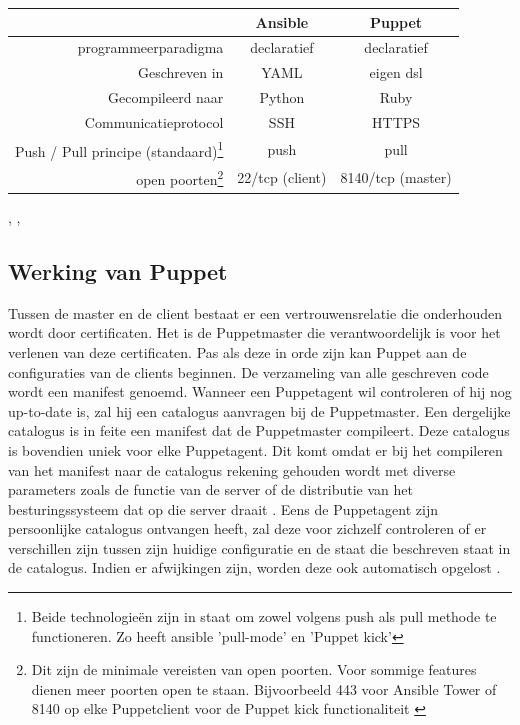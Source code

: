 \begin{minipage}{15cm}
\begin{tabular}{ r |c c }
& \textbf{Ansible} & \textbf{Puppet} \\
  \hline	  		
\gls{programmeerparadigma}  & declaratief & declaratief  \\
   \hline
 Geschreven in & YAML & eigen \gls{dsl}  \\
     \hline
      Gecompileerd naar & Python & Ruby \\
     \hline
   Communicatieprotocol & SSH & HTTPS \\
  
   \hline
  Push / Pull principe (standaard)\footnote{Beide technologie\"en zijn in staat om zowel volgens push als pull methode te functioneren. Zo heeft ansible 'pull-mode' \autocite{ansiblePull} en \textcite{puppetkick} 'Puppet kick' } & \gls{push} & \gls{pull} \\
   \hline
   open poorten\footnote{Dit zijn de minimale vereisten van open poorten. Voor sommige features dienen meer poorten open te staan. Bijvoorbeeld 443 voor Ansible Tower of 8140 op elke Puppetclient voor de Puppet kick functionaliteit \autocite{puppetkick} }  & 22/tcp (client) & 8140/tcp (master)\\
  \end{tabular}
  \end{minipage}   
 \textcite{languagePuppet}, \textcite{masterproef}, \textcite{ansibledoc}

\subsection{Werking van Puppet}

Tussen de master en de client bestaat er een vertrouwensrelatie die onderhouden wordt door certificaten. Het is de Puppetmaster die verantwoordelijk is voor het verlenen van deze certificaten. Pas als deze in orde zijn kan Puppet  aan de configuraties van de clients beginnen. De verzameling van alle geschreven code wordt een manifest genoemd. Wanneer een Puppetagent wil controleren of hij nog up-to-date is, zal hij een catalogus aanvragen bij de Puppetmaster. Een dergelijke catalogus is in feite een manifest dat de Puppetmaster compileert. Deze catalogus is bovendien uniek voor elke Puppetagent. Dit komt omdat er bij het compileren van het manifest naar de catalogus rekening gehouden wordt met diverse parameters zoals de functie van de server of de distributie van het besturingssysteem dat op die server draait \autocite{Puppetlanguagecatalog}. Eens de Puppetagent zijn persoonlijke catalogus ontvangen heeft, zal deze voor zichzelf controleren of er verschillen zijn tussen zijn huidige configuratie en de staat die beschreven staat in de catalogus. Indien er afwijkingen zijn, worden deze ook automatisch opgelost \autocite{puppetdoc}.

